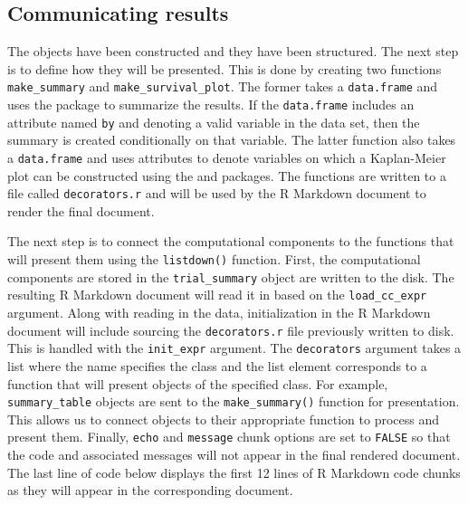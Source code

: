 \hypertarget{communicating-results}{%
\subsection{Communicating results}\label{communicating-results}}

The objects have been constructed and they have been structured. The
next step is to define how they will be presented. This is done by
creating two functions \texttt{make\_summary} and
\texttt{make\_survival\_plot}. The former takes a \texttt{data.frame}
and uses the  package to summarize the results. If the
\texttt{data.frame} includes an attribute named \texttt{by} and denoting
a valid variable in the data set, then the summary is created
conditionally on that variable. The latter function also takes a
\texttt{data.frame} and uses attributes to denote variables on which a
Kaplan-Meier plot can be constructed using the 
\citep{survival} and  packages. The functions are written
to a file called \texttt{decorators.r} and will be used by the R
Markdown document to render the final document.

\begin{Schunk}
\end{Schunk}

The next step is to connect the computational components to the
functions that will present them using the \texttt{listdown()} function.
First, the computational components are stored in the
\texttt{trial\_summary} object are written to the disk. The resulting R
Markdown document will read it in based on the \texttt{load\_cc\_expr}
argument. Along with reading in the data, initialization in the R
Markdown document will include sourcing the \texttt{decorators.r} file
previously written to disk. This is handled with the \texttt{init\_expr}
argument. The \texttt{decorators} argument takes a list where the name
specifies the class and the list element corresponds to a function that
will present objects of the specified class. For example,
\texttt{summary\_table} objects are sent to the \texttt{make\_summary()}
function for presentation. This allows us to connect objects to their
appropriate function to process and present them. Finally, \texttt{echo}
and \texttt{message} chunk options are set to \texttt{FALSE} so that the
code and associated messages will not appear in the final rendered
document. The last line of code below displays the first 12 lines of R
Markdown code chunks as they will appear in the corresponding document.

